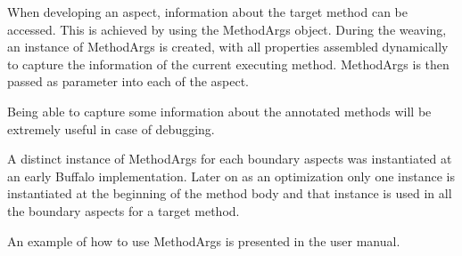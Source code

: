 When developing an aspect, information about the target method can be accessed. This is achieved by using the MethodArgs object. During the weaving, an instance of MethodArgs is created, with all properties assembled dynamically to capture the information of the current executing method. MethodArgs is then passed as parameter into each of the aspect.

Being able to capture some information about the annotated methods will be  extremely useful in case of debugging.

A distinct instance of MethodArgs for each boundary aspects was instantiated at an early Buffalo implementation. Later on as an optimization only one instance is instantiated at the beginning of the method body and that instance is used in all the boundary aspects for a target method.

An example of how to use MethodArgs is presented in the user manual.
